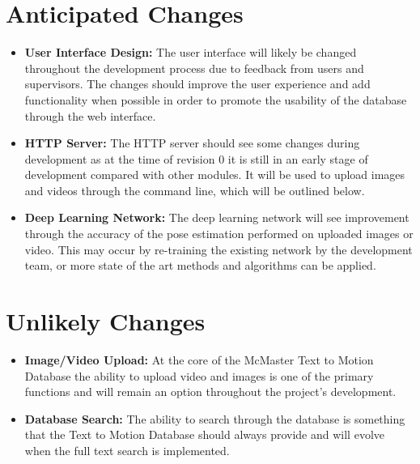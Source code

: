 \documentclass{scrreprt}
\begin{document}
\section{Anticipated Changes}

\begin{itemize}
    \item \textbf {User Interface Design:} The user interface will likely be
            changed throughout the development process due to feedback from
                  users and supervisors. The changes should improve the user
                  experience and add functionality when possible in order to
                  promote the usability of the database through the web
                  interface.
    \item \textbf {HTTP Server:} The HTTP server should see some changes during
            development as at the time of revision 0 it is still in an early
                  stage of development compared with other modules. It will be
                  used to upload images and videos through the command line,
                  which will be outlined below.
    \item \textbf{Deep Learning Network:} The deep learning network will see
            improvement through the accuracy of the pose estimation performed
                  on uploaded images or video. This may occur by re-training
                  the existing network by the development team, or more state
                  of the art methods and algorithms can be applied.
\end{itemize}

\section{Unlikely Changes}

\begin{itemize}
    \item \textbf {Image/Video Upload:} At the core of the McMaster Text to
            Motion Database the ability to upload video and images is one of
                  the primary functions and will remain an option throughout
                  the project's development.
    \item \textbf {Database Search:} The ability to search through the database
            is something that the Text to Motion Database should always provide
                  and will evolve when the full text search is implemented.
\end{itemize}
\end{document}
